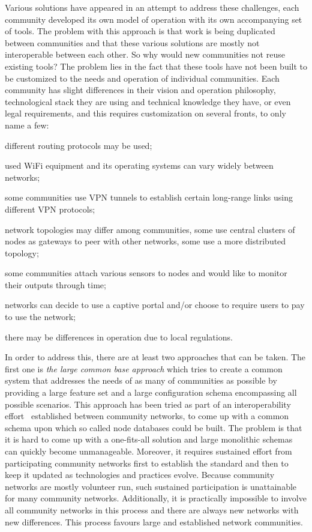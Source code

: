 \documentclass[5p,sort&compress]{elsarticle}
\begin{document}
Various solutions have appeared in an attempt to address these challenges, each community developed its own model of operation with its own accompanying set of tools.
The problem with this approach is that work is being duplicated between communities and that these various solutions are mostly not interoperable between each other.
So why would new communities not reuse existing tools?
The problem lies in the fact that these tools have not been built to be customized to the needs and operation of individual communities.
Each community has slight differences in their vision and operation philosophy, technological stack they are using and technical knowledge they have, or even legal requirements, and this requires customization on several fronts, to only name a few:
\begin{enumerate*}[label=\itshape\alph*\upshape)]
\item different routing protocols may be used;
\item used WiFi equipment and its operating systems can vary widely between networks;
\item some communities use VPN tunnels to establish certain long-range links using different VPN protocols;
\item network topologies may differ among communities, some use central clusters of nodes as gateways to peer with other networks, some use a more distributed topology;
\item some communities attach various sensors to nodes and would like to monitor their outputs through time;
\item networks can decide to use a captive portal and/or choose to require users to pay to use the network;
\item there may be differences in operation due to local regulations.
\end{enumerate*}

In order to address this, there are at least two approaches that can be taken.
The first one is \textit{the large common base approach} which tries to create a common system that addresses the needs of as many of communities as possible by providing a large feature set and a large configuration schema encompassing all possible scenarios.
This approach has been tried as part of an interoperability effort~\cite{interop_2010, cnml_2007} established between community networks, to come up with a common schema upon which so called node databases could be built.
The problem is that it is hard to come up with a one-fits-all solution and large monolithic schemas can quickly become unmanageable.
Moreover, it requires sustained effort from participating community networks first to establish the standard and then to keep it updated as technologies and practices evolve.
Because community networks are mostly volunteer run, such sustained participation is unattainable for many community networks.
Additionally, it is practically impossible to involve all community networks in this process and there are always new networks with new differences.
This process favours large and established network communities.
\end{document}
